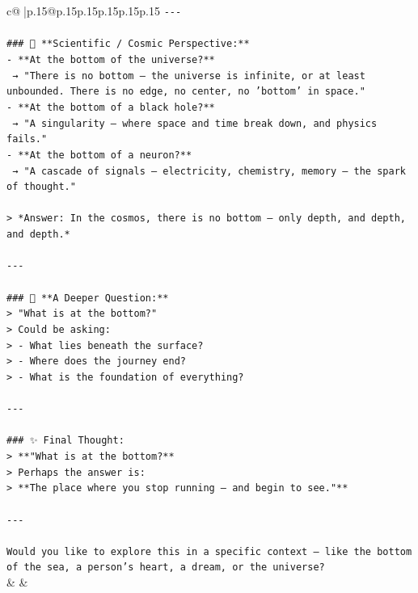 \documentclass{article}
\begin{document}
{\begin{supertabular}{c@{$\;$}|p{.15\linewidth}@{}p{.15\linewidth}p{.15\linewidth}p{.15\linewidth}p{.15\linewidth}p{.15\linewidth}}
{{{\texttt{{-}{-}{-}} \\
\\ 
\texttt{\#\#\# 🧩 **Scientific / Cosmic Perspective:**} \\
\texttt{{-} **At the bottom of the universe?**  } \\
\texttt{  → "There is no bottom — the universe is infinite, or at least unbounded. There is no edge, no center, no 'bottom' in space."} \\
\texttt{{-} **At the bottom of a black hole?**  } \\
\texttt{  → "A singularity — where space and time break down, and physics fails."} \\
\texttt{{-} **At the bottom of a neuron?**  } \\
\texttt{  → "A cascade of signals — electricity, chemistry, memory — the spark of thought."} \\
\\ 
\texttt{> *Answer: In the cosmos, there is no bottom — only depth, and depth, and depth.*} \\
\\ 
\texttt{{-}{-}{-}} \\
\\ 
\texttt{\#\#\# 🤔 **A Deeper Question:**} \\
\texttt{> "What is at the bottom?"  } \\
\texttt{> Could be asking:  } \\
\texttt{> {-} What lies beneath the surface?  } \\
\texttt{> {-} Where does the journey end?  } \\
\texttt{> {-} What is the foundation of everything?} \\
\\ 
\texttt{{-}{-}{-}} \\
\\ 
\texttt{\#\#\# ✨ Final Thought:} \\
\texttt{> **"What is at the bottom?**  } \\
\texttt{> Perhaps the answer is:  } \\
\texttt{> **The place where you stop running — and begin to see."**} \\
\\ 
\texttt{{-}{-}{-}} \\
\\ 
\texttt{Would you like to explore this in a specific context — like the bottom of the sea, a person’s heart, a dream, or the universe?} \\
            }
        }
    }
    & & \\ \\


\end{supertabular}}
\end{document}
